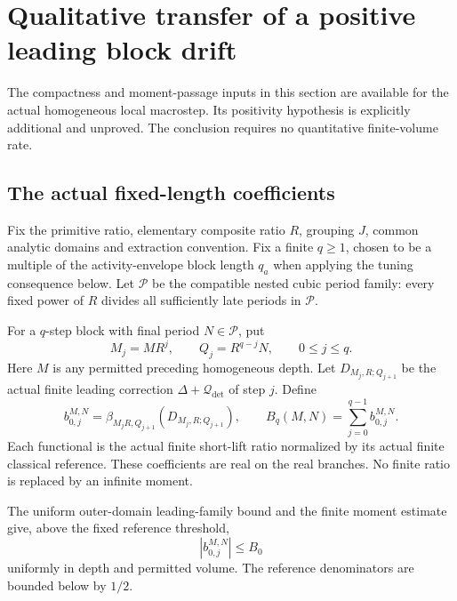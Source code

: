 \section{Qualitative transfer of a positive leading block drift}
\label{fbt-section}

The compactness and moment-passage inputs in this section are
available for the actual homogeneous local macrostep. Its
positivity hypothesis is explicitly additional and unproved.
The conclusion requires no quantitative finite-volume rate.

\subsection{The actual fixed-length coefficients}
\label{fbt-setup}

Fix the primitive ratio, elementary composite ratio \(R\),
grouping \(J\), common analytic domains and extraction
convention. Fix a finite \(q\ge1\), chosen to be a multiple
of the activity-envelope block length \(q_a\) when applying
the tuning consequence below. Let \(\mathcal P\) be the
compatible nested cubic period family: every fixed power
of \(R\) divides all sufficiently late periods in
\(\mathcal P\).

For a \(q\)-step block with final period \(N\in\mathcal P\),
put
\begin{equation}
 M_j=MR^j,\qquad Q_j=R^{q-j}N,\qquad 0\le j\le q.
 \label{fbt-block-scales}
\end{equation}
Here \(M\) is any permitted preceding homogeneous depth.
Let \(D_{M_j,R;Q_{j+1}}\) be the actual finite leading
correction \(\Delta+\mathcal Q_{\det}\) of step \(j\).
Define
\begin{equation}
 b_{0,j}^{M,N}
    =\beta_{M_jR,Q_{j+1}}(D_{M_j,R;Q_{j+1}}),
 \qquad
 B_q(M,N)=\sum_{j=0}^{q-1}b_{0,j}^{M,N}.
 \label{fbt-finite-coefficients}
\end{equation}
Each functional is the actual finite short-lift ratio
normalized by its actual finite classical reference.
These coefficients are real on the real branches.
No finite ratio is replaced by an infinite moment.

The uniform outer-domain leading-family bound and the
finite moment estimate give, above the fixed reference
threshold,
\begin{equation}
                          |b_{0,j}^{M,N}|\le B_0
 \label{fbt-leading-bound}
\end{equation}
uniformly in depth and permitted volume. The reference
denominators are bounded below by \(1/2\).

